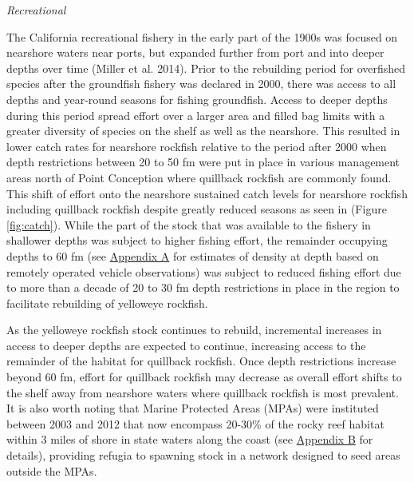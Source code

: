 \documentclass[11pt,
  english,
  a4paper,
]{article}
\begin{document}
\leavevmode\tagmcend\tagstructend\par


\emph{Recreational}

\leavevmode\tagmcend\tagstructend\par


The California recreational fishery in the early part of the 1900s was focused on nearshore waters near ports, but expanded further from port and into deeper depths over time {(Miller et al. 2014)\leavevmode\tagmcend\tagstructend}. Prior to the rebuilding period for overfished species after the groundfish fishery was declared in 2000, there was access to all depths and year-round seasons for fishing groundfish. Access to deeper depths during this period spread effort over a larger area and filled bag limits with a greater diversity of species on the shelf as well as the nearshore. This resulted in lower catch rates for nearshore rockfish relative to the period after 2000 when depth restrictions between 20 to 50 fm were put in place in various management areas north of Point Conception where quillback rockfish are commonly found. This shift of effort onto the nearshore sustained catch levels for nearshore rockfish including quillback rockfish despite greatly reduced seasons as seen in (Figure \ref{fig:catch}). While the part of the stock that was available to the fishery in shallower depths was subject to higher fishing effort, the remainder occupying depths to 60 fm (see {\protect\hyperlink{append_a}{Appendix A}\leavevmode\tagmcend\tagstructend} for estimates of density at depth based on remotely operated vehicle observations) was subject to reduced fishing effort due to more than a decade of 20 to 30 fm depth restrictions in place in the region to facilitate rebuilding of yelloweye rockfish.

\leavevmode\tagmcend\tagstructend\par


As the yelloweye rockfish stock continues to rebuild, incremental increases in access to deeper depths are expected to continue, increasing access to the remainder of the habitat for quillback rockfish. Once depth restrictions increase beyond 60 fm, effort for quillback rockfish may decrease as overall effort shifts to the shelf away from nearshore waters where quillback rockfish is most prevalent. It is also worth noting that Marine Protected Areas (MPAs) were instituted between 2003 and 2012 that now encompass 20-30\% of the rocky reef habitat within 3 miles of shore in state waters along the coast (see {\protect\hyperlink{append_b}{Appendix B}\leavevmode\tagmcend\tagstructend} for details), providing refugia to spawning stock in a network designed to seed areas outside the MPAs.
\end{document}
